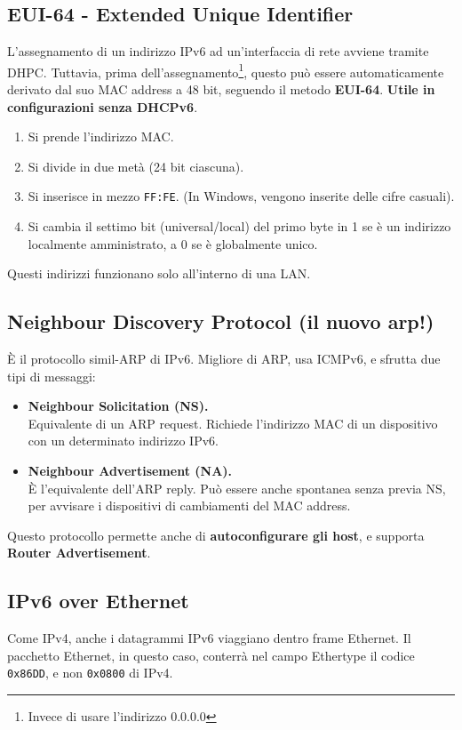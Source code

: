 \subsection{EUI-64 - Extended Unique Identifier}

L'assegnamento di un indirizzo IPv6 ad un'interfaccia di rete avviene tramite DHPC. Tuttavia, prima dell'assegnamento\footnote{Invece di usare l'indirizzo 0.0.0.0}, questo può essere automaticamente derivato dal suo MAC address a 48 bit, seguendo il metodo \textbf{EUI-64}. \textbf{Utile in configurazioni senza DHCPv6}.

\begin{enumerate}
	\item Si prende l'indirizzo MAC.
	\item Si divide in due metà (24 bit ciascuna).
	\item Si inserisce in mezzo \verb|FF:FE|. (In Windows, vengono inserite delle cifre casuali).
	\item Si cambia il settimo bit (universal/local) del primo byte in 1 se è un indirizzo localmente amministrato, a 0 se è globalmente unico.
\end{enumerate}

Questi indirizzi funzionano solo all'interno di una LAN.
\subsection{Neighbour Discovery Protocol (il nuovo arp!)}
È il protocollo simil-ARP di IPv6. Migliore di ARP, usa ICMPv6, e sfrutta due tipi di messaggi:

\begin{itemize}
	\item \textbf{Neighbour Solicitation (NS).}\\
	Equivalente di un ARP request. Richiede l'indirizzo MAC di un dispositivo con un determinato indirizzo IPv6.
	\item \textbf{Neighbour Advertisement (NA).}\\
	È l'equivalente dell'ARP reply. Può essere anche spontanea senza previa NS, per avvisare i dispositivi di cambiamenti del MAC address.
\end{itemize}
Questo protocollo permette anche di \textbf{autoconfigurare gli host}, e supporta \textbf{Router Advertisement}.

\subsection{IPv6 over Ethernet}
Come IPv4, anche i datagrammi IPv6 viaggiano dentro frame Ethernet. Il pacchetto Ethernet, in questo caso, conterrà nel campo Ethertype il codice \verb|0x86DD|, e non \verb|0x0800| di IPv4.


